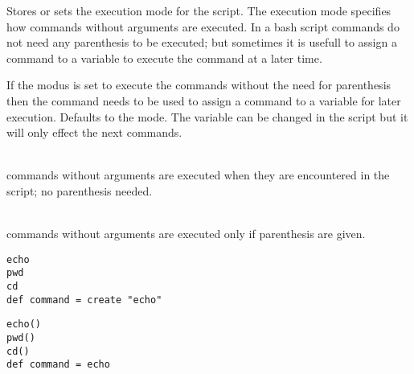 %

Stores or sets the execution mode for the script. The execution mode specifies
how commands without arguments are executed. In a bash script commands
do not need any parenthesis to be executed; but sometimes it is usefull
to assign a command to a variable to execute the command at a later time.

If the modus is set to execute the commands without the need for parenthesis
then the  command needs to be used to assign a command to
a variable for later execution. Defaults to the  mode.
The variable can be changed in the script but it will only effect the next
commands.

\begin{asparadesc}
%
\item[\code{IMPLICIT}]  \hfill \\
commands without arguments are executed when they are encountered in the script;
no parenthesis needed.
%
\item[\code{EXPLICIT}]  \hfill \\
commands without arguments are executed only if parenthesis are given.
%
\end{asparadesc}

\begin{lstlisting}[style=Groovybash, label={lst:example_exmode1}, title={
Implicit execution of commands; the build-in command create needs to be used 
to assign commands to a variable.}]
echo
pwd
cd
def command = create "echo"
\end{lstlisting}

\begin{lstlisting}[style=Groovybash, label={lst:example_exmode1}, title={
Explicit execution of commands; the parenthesis needs to be used to execute the command
but no need for the create build-in.}]
echo()
pwd()
cd()
def command = echo
\end{lstlisting}

